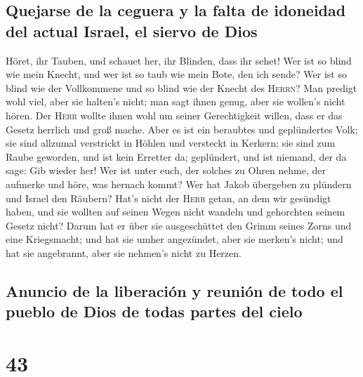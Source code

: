 \hypertarget{quejarse-de-la-ceguera-y-la-falta-de-idoneidad-del-actual-israel-el-siervo-de-dios}{%
\subsection{Quejarse de la ceguera y la falta de idoneidad del actual
Israel, el siervo de
Dios}\label{quejarse-de-la-ceguera-y-la-falta-de-idoneidad-del-actual-israel-el-siervo-de-dios}}

 Höret, ihr Tauben, und schauet her, ihr Blinden, dass
ihr sehet!  Wer ist so blind wie mein Knecht, und wer ist
so taub wie mein Bote, den ich sende? Wer ist so blind wie der
Vollkommene und so blind wie der Knecht des \textsc{Herrn}?
 Man predigt wohl viel, aber sie halten's nicht; man sagt
ihnen genug, aber sie wollen's nicht hören.  Der
\textsc{Herr} wollte ihnen wohl um seiner Gerechtigkeit willen, dass er
das Gesetz herrlich und groß mache.  Aber es ist ein
beraubtes und geplündertes Volk; sie sind allzumal verstrickt in Höhlen
und versteckt in Kerkern; sie sind zum Raube geworden, und ist kein
Erretter da; geplündert, und ist niemand, der da sage: Gib wieder her!
 Wer ist unter euch, der solches zu Ohren nehme, der
aufmerke und höre, was hernach kommt?  Wer hat Jakob
übergeben zu plündern und Israel den Räubern? Hat's nicht der
\textsc{Herr} getan, an dem wir gesündigt haben, und sie wollten auf
seinen Wegen nicht wandeln und gehorchten seinem Gesetz nicht?
 Darum hat er über sie ausgeschüttet den Grimm seines
Zorns und eine Kriegsmacht; und hat sie umher angezündet, aber sie
merken's nicht; und hat sie angebrannt, aber sie nehmen's nicht zu
Herzen.

\hypertarget{anuncio-de-la-liberaciuxf3n-y-reuniuxf3n-de-todo-el-pueblo-de-dios-de-todas-partes-del-cielo}{%
\subsection{Anuncio de la liberación y reunión de todo el pueblo de Dios
de todas partes del
cielo}\label{anuncio-de-la-liberaciuxf3n-y-reuniuxf3n-de-todo-el-pueblo-de-dios-de-todas-partes-del-cielo}}

\hypertarget{section-42}{%
\section{43}\label{section-42}}

